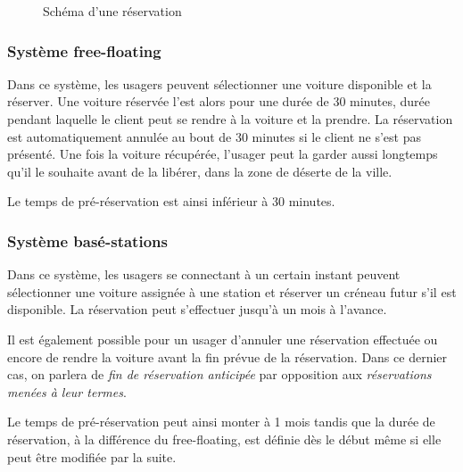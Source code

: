 \documentclass[12pt,a4paper]{article}
\newcommand{\1}[1]{\mathbbm{1}_{\{#1\}} }
\theoremstyle{definition}
\begin{document}
\begin{figure}[h]
\centering
{}
\caption{Schéma d'une réservation}
\end{figure}


\subsubsection{Système free-floating}

Dans ce système, les usagers peuvent sélectionner une voiture disponible et la réserver. Une voiture réservée l'est alors pour une durée de 30 minutes, durée pendant laquelle le client peut se rendre à la voiture et la prendre. La réservation est automatiquement annulée au bout de 30 minutes si le client ne s'est pas présenté. Une fois la voiture récupérée, l'usager peut la garder aussi longtemps qu'il le souhaite avant de la libérer, dans la zone de déserte de la ville.

Le temps de pré-réservation est ainsi inférieur à 30 minutes.

\subsubsection{Système basé-stations}

Dans ce système, les usagers se connectant à un certain instant peuvent sélectionner une voiture assignée à une station et réserver un créneau futur s'il est disponible. La réservation peut s'effectuer jusqu'à un mois à l'avance.

Il est également possible pour un usager d'annuler une réservation effectuée ou encore de rendre la voiture avant la fin prévue de la réservation. Dans ce dernier cas, on parlera de \emph{fin de réservation anticipée} par opposition aux \emph{réservations menées à leur termes}.

Le temps de pré-réservation peut ainsi monter à 1 mois tandis que la durée de réservation, à la différence du free-floating, est définie dès le début même si elle peut être modifiée par la suite.
\end{document}
